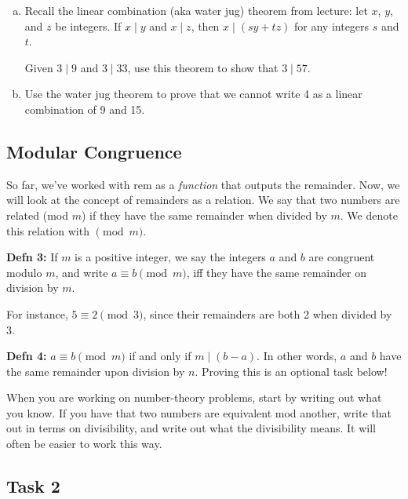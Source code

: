 \documentclass[12pt,letterpaper]{article}
\begin{document}
\begin{enumerate}[a.]
	    \item
	    Recall the linear combination (aka water jug) theorem from lecture: let $x$, $y$, and $z$ be integers. If $x \mid y$ and $x \mid z$, then $x \mid (sy + tz)$ for any integers $s$ and $t$.
	    
	    Given $3 \mid 9$ and $3 \mid 33$, use this theorem to show that $3 \mid 57$.
	    \begin{mdframed} \vspace{2cm} \end{mdframed}
	    
	     \item
	     Use the water jug theorem to prove that we cannot write 4 as a linear combination of 9 and 15. 
	     
	     \begin{mdframed} \vspace{2cm} \end{mdframed}
	\end{enumerate}
	
	\subsection*{Modular Congruence}
	
	So far, we've worked with rem as a \textit{function} that outputs the remainder. Now, we will look at the concept of remainders as a relation. We say that two numbers are related (mod $m$) if they have the same remainder when divided by $m$. We denote this relation with $\pmod m$.

    \textbf{Defn 3:} If $m$ is a positive integer, we say the integers $a$ and $b$ are congruent modulo $m$, and write $a \equiv b \pmod m$, iff they have the same remainder on division by $m$.
    
    For instance, $5 \equiv 2 \pmod 3$, since their remainders are both 2 when divided by 3.
    
	\textbf{Defn 4:} $a \equiv b \pmod m$ if and only if $m \mid (b-a)$. In other words, $a$ and $b$ have the same remainder upon division by $n$. Proving this is an optional task below!
	
	When you are working on number-theory problems, start by writing out what you know. If you have that two numbers are equivalent mod another, write that out in terms on divisibility, and write out what the divisibility means. It will often be easier to work this way.
	
	\subsection*{Task 2}
	
\end{document}
